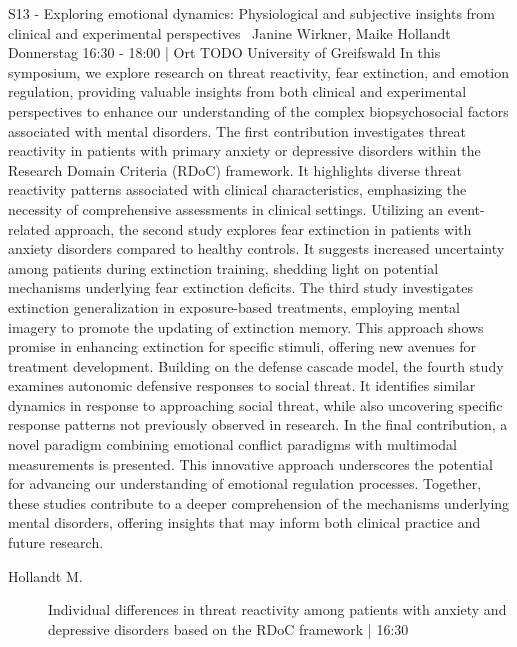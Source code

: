 
            \begin{symposium}
            {S13 - Exploring emotional dynamics: Physiological and subjective insights from clinical and experimental perspectives }
            { Janine Wirkner, Maike Hollandt}
            {Donnerstag 16:30 - 18:00 | Ort TODO}
            {University of Greifswald}
            In this symposium, we explore research on threat reactivity, fear extinction, and emotion regulation, providing valuable insights from both clinical and experimental perspectives to enhance our understanding of the complex biopsychosocial factors associated with mental disorders.
The first contribution investigates threat reactivity in patients with primary anxiety or depressive disorders within the Research Domain Criteria (RDoC) framework. It highlights diverse threat reactivity patterns associated with clinical characteristics, emphasizing the necessity of comprehensive assessments in clinical settings. Utilizing an event-related approach, the second study explores fear extinction in patients with anxiety disorders compared to healthy controls. It suggests increased uncertainty among patients during extinction training, shedding light on potential mechanisms underlying fear extinction deficits. The third study investigates extinction generalization in exposure-based treatments, employing mental imagery to promote the updating of extinction memory. This approach shows promise in enhancing extinction for specific stimuli, offering new avenues for treatment development. Building on the defense cascade model, the fourth study examines autonomic defensive responses to social threat. It identifies similar dynamics in response to approaching social threat, while also uncovering specific response patterns not previously observed in research. In the final contribution, a novel paradigm combining emotional conflict paradigms with multimodal measurements is presented. This innovative approach underscores the potential for advancing our understanding of emotional regulation processes. Together, these studies contribute to a deeper comprehension of the mechanisms underlying mental disorders, offering insights that may inform both clinical practice and future research.
            \begin{description}    
            
                \item [ Hollandt M.] Individual differences in threat reactivity among patients with anxiety and depressive disorders based on the RDoC framework \textcolor{mygray}{ | 16:30}    
                

\end{description}
\end{symposium}

